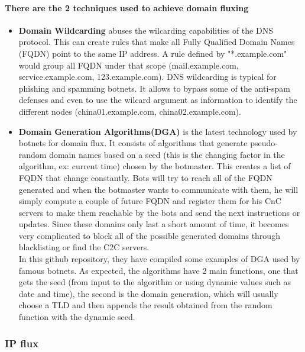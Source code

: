 \paragraph{There are the 2 techniques used to achieve domain fluxing}
\begin{itemize}[noitemsep]
\item \textbf{Domain Wildcarding} abuses the wilcarding capabilities of the DNS protocol. This can create rules that make all Fully Qualified Domain Names (FQDN) point to the same IP address. A rule defined by "*.example.com" would group all FQDN under that scope (mail.example.com, service.example.com, 123.example.com). DNS wildcarding is typical for phishing and spamming botnets. It allows to bypass some of the anti-spam defenses and even to use the wilcard argument as information to identify the different nodes (china01.example.com, china02.example.com).\cite{fqdn}
\item \textbf{Domain Generation Algorithms(DGA)} is the latest technology used by botnets for domain flux. It consists of algorithms that generate pseudo-random domain names based on a seed (this is the changing factor in the algorithm, ex: current time) chosen by the botmaster. This creates a list of FQDN that change constantly. Bots will try to reach all of the FQDN generated and when the botmaster wants to communicate with them, he will simply compute a couple of future FQDN and register them for his CnC servers to make them reachable by the bots and send the next instructions or updates. Since these domains only last a short amount of time, it becomes very complicated to block all of the possible generated domains through blacklisting or find the C2C servers.\\
In this github repository\cite{dga1}, they have compiled some examples of DGA used by famous botnets. As expected, the algorithms have 2 main functions, one that gets the seed (from input to the algorithm or using dynamic values such as date and time), the second is the domain generation, which will usually choose a TLD and then appends the result obtained from the random function with the dynamic seed.
\end{itemize}

\subsubsection{IP flux}
